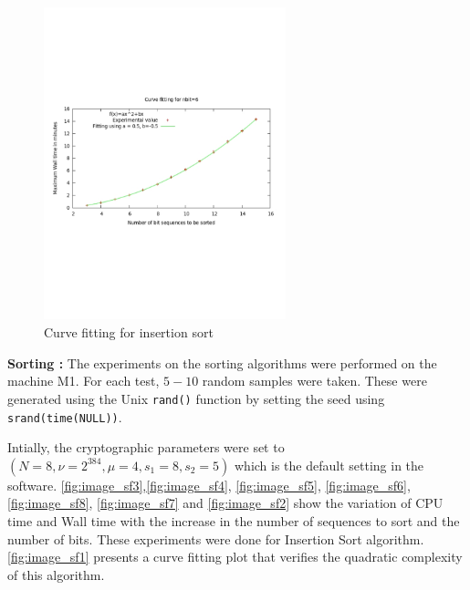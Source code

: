 \documentclass{acm_proc_article-sp}
\begin{document}
\begin{figure}[!H]%
\centering
\includegraphics[width=7cm]{fsort1.pdf} 
\caption{Curve fitting for insertion sort}
\label{fig:image_sf1} %
\end{figure}



 \textbf{Sorting :} 
The experiments on the sorting algorithms were performed on the machine M1. For each test, $5-10$ random samples were taken. These were generated using the Unix \texttt{rand()} function by setting the seed using \texttt{srand(time(NULL))}. 

Intially, the cryptographic parameters were set to $(N = 8, \nu = 2^{384}, \mu = 4, s_1 = 8, s_2 = 5)$ which is the default setting in the software. \autoref{fig:image_sf3},\autoref{fig:image_sf4}, \autoref{fig:image_sf5}, \autoref{fig:image_sf6}, \\ \autoref{fig:image_sf8}, \autoref{fig:image_sf7} and \autoref{fig:image_sf2} show the variation of CPU time and Wall time with the increase in the number of sequences to sort and the number of bits. These experiments were done for Insertion Sort algorithm. \autoref{fig:image_sf1} presents a  curve fitting plot that verifies the quadratic complexity of this algorithm.
\end{document}
